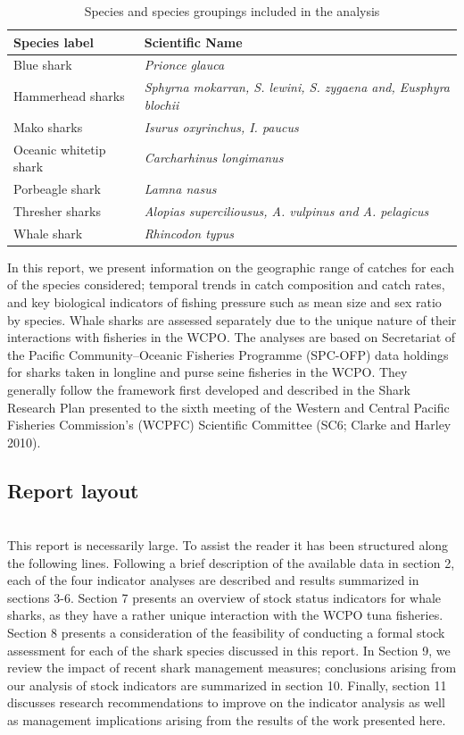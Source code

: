 \documentclass[12pt]{SCreport}
\begin{document}
\begin{table}[!h]
\label{tbl:sppgroups}
\begin{center}
\caption{Species and species groupings included in the analysis}
\begin{tabular}{l|l}
Species label & Scientific Name\\
\hline
\hline
Blue shark        &	\textit{Prionce glauca}\\
Hammerhead sharks & \textit{Sphyrna mokarran, S. lewini, S. zygaena and, Eusphyra blochii}\\
Mako sharks       & \textit{Isurus oxyrinchus, I. paucus}\\
Oceanic whitetip shark & \textit{Carcharhinus longimanus}\\
Porbeagle shark	  & \textit{Lamna nasus}\\
Thresher sharks	  & \textit{Alopias superciliousus, A. vulpinus and A. pelagicus}\\
Whale shark	      & \textit{Rhincodon typus} \\
\hline
\end{tabular} 
\end{center}
\end{table}

In this report, we present information on the geographic range of catches for each of the species considered; temporal trends in catch composition and catch rates, and key biological indicators of fishing pressure such as mean size and sex ratio by species. Whale sharks are assessed separately due to the unique nature of their interactions with fisheries in the WCPO. The analyses are based on Secretariat of the Pacific Community--Oceanic Fisheries Programme (SPC-OFP) data holdings for sharks taken in longline and purse seine fisheries in the WCPO.  They generally follow the framework first developed and described in the Shark Research Plan presented to the sixth meeting of the Western and Central Pacific Fisheries Commission's (WCPFC) Scientific Committee (SC6; Clarke and Harley 2010). 

\subsection{Report layout}
\\
This report is necessarily large. To assist the reader it has been structured along the following lines.
Following a brief description of the available data in section 2, each of the four indicator analyses
are described and results summarized in sections 3-6. Section 7 presents an overview of stock status indicators for whale sharks, as they have a rather unique interaction with the WCPO tuna fisheries. Section 8 presents a consideration of the
feasibility of conducting a formal stock assessment for each of the shark species discussed in this
report. In Section 9, we review the impact of recent shark management measures; conclusions arising from our analysis of stock indicators are summarized in section 10. Finally, section 11 discusses research recommendations to improve on the indicator analysis as well as management implications arising from the results of the work presented here.
\end{document}
